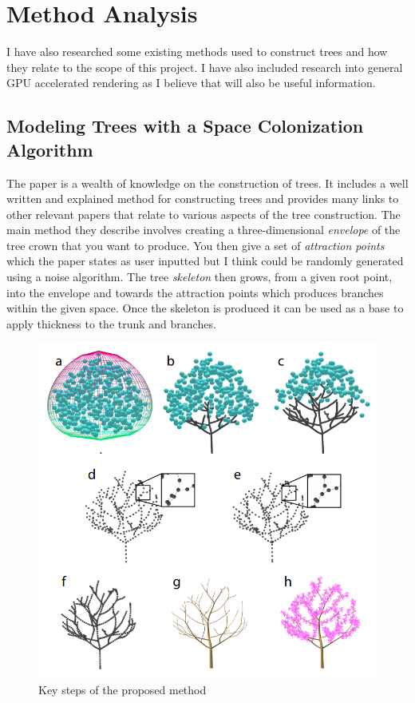 \documentclass[proposal]{cmpreport}
\begin{document}
\pagebreak
\section{Method Analysis}
I have also researched some existing methods used to construct trees and how they 
relate to the scope of this project. I have also included research into general 
GPU accelerated rendering as I believe that will also be useful information.

\subsection{Modeling Trees with a Space Colonization Algorithm}
The paper \cite{colonization} is a wealth of knowledge on the construction of trees. 
It includes a well written and explained method for constructing trees and provides 
many links to other relevant papers that relate to various aspects of the tree 
construction. The main method they describe involves creating a three-dimensional 
\textit{envelope} of the tree crown that you want to produce. You then give a set of 
\textit{attraction points} which the paper states as user inputted but I think could be 
randomly generated using a noise algorithm. The tree \textit{skeleton} then grows, from a 
given root point, into the envelope and towards the attraction points which produces 
branches within the given space. Once the skeleton is produced it can be used as a 
base to apply thickness to the trunk and branches.

\begin{figure}[h]
        \caption{Key steps of the proposed method}
        \includegraphics[scale=0.47]{AttractionPoints}
        \centering
\end{figure}
\end{document}
